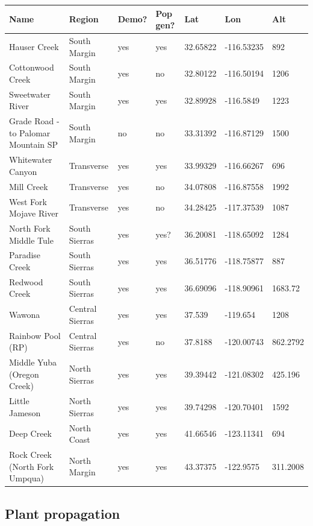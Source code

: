 \documentclass[11pt, oneside]{article}
\begin{document}
\begin{table}[htbp]
   \centering
   \begin{tabular}{@{} lllllll @{}}
      \toprule
      Name    & Region & Demo? & Pop gen? & Lat & Lon & Alt \\
      \midrule
	Hauser Creek						& South Margin		& yes	& yes	& 32.65822	& -116.53235	& 892 \\
	Cottonwood Creek					& South Margin		& yes	& no		& 32.80122	& -116.50194	& 1206 \\
	Sweetwater River					& South Margin		& yes	& yes	& 32.89928	& -116.5849	& 1223 \\
	Grade Road - to Palomar Mountain SP	& South Margin		& no		& no		& 33.31392	& -116.87129	& 1500 \\
	Whitewater Canyon					& Transverse		& yes	& yes	& 33.99329	& -116.66267	& 696 \\
	Mill Creek							& Transverse		& yes	& no		& 34.07808	& -116.87558	& 1992 \\
	West Fork Mojave River				& Transverse		& yes	& no		& 34.28425	& -117.37539	& 1087 \\
	North Fork Middle Tule				& South Sierras		& yes	& yes?	& 36.20081	& -118.65092	& 1284 \\
	Paradise Creek						& South Sierras		& yes	& yes	& 36.51776	& -118.75877	& 887 \\
	Redwood Creek					& South Sierras		& yes	& yes	& 36.69096	& -118.90961	& 1683.72 \\
	Wawona							& Central Sierras	& yes	& yes	& 37.539		& -119.654	& 1208 \\
	Rainbow Pool (RP)					& Central Sierras	& yes	& no		& 37.8188		& -120.00743	& 862.2792 \\
	Middle Yuba (Oregon Creek)			& North Sierras		& yes	& yes	& 39.39442	& -121.08302	& 425.196 \\
	Little Jameson						& North Sierras		& yes	& yes	& 39.74298	& -120.70401	& 1592 \\
	Deep Creek						& North Coast		& yes	& yes	& 41.66546	& -123.11341	& 694 \\
	Rock Creek (North Fork Umpqua)		& North Margin		& yes	& yes	& 43.37375	& -122.9575	& 311.2008 \\
	\bottomrule
   \end{tabular}
\end{table}

\subsection*{Plant propagation}
\end{document}
